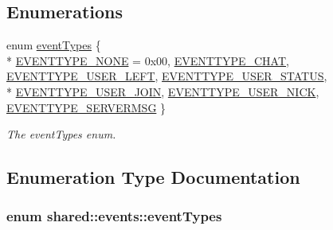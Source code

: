 \subsection*{Enumerations}
\begin{DoxyCompactItemize}
\item 
enum \hyperlink{namespaceshared_1_1events_a758b1a88b2eb1c9ef9388755f8869ad7}{event\-Types} \{ \\*
\hyperlink{namespaceshared_1_1events_a758b1a88b2eb1c9ef9388755f8869ad7aa9e485704f21f82413549a0228364596}{E\-V\-E\-N\-T\-T\-Y\-P\-E\-\_\-\-N\-O\-N\-E} = 0x00, 
\hyperlink{namespaceshared_1_1events_a758b1a88b2eb1c9ef9388755f8869ad7a5ab6f914eb6843be3d428f43169810c5}{E\-V\-E\-N\-T\-T\-Y\-P\-E\-\_\-\-C\-H\-A\-T}, 
\hyperlink{namespaceshared_1_1events_a758b1a88b2eb1c9ef9388755f8869ad7a11a907ca7840fc633c2dfb6efd6cc782}{E\-V\-E\-N\-T\-T\-Y\-P\-E\-\_\-\-U\-S\-E\-R\-\_\-\-L\-E\-F\-T}, 
\hyperlink{namespaceshared_1_1events_a758b1a88b2eb1c9ef9388755f8869ad7aac1455886686436f7d0bb87b9a4554cf}{E\-V\-E\-N\-T\-T\-Y\-P\-E\-\_\-\-U\-S\-E\-R\-\_\-\-S\-T\-A\-T\-U\-S}, 
\\*
\hyperlink{namespaceshared_1_1events_a758b1a88b2eb1c9ef9388755f8869ad7a9cb818acb5b5437a704503b7ac27a7ae}{E\-V\-E\-N\-T\-T\-Y\-P\-E\-\_\-\-U\-S\-E\-R\-\_\-\-J\-O\-I\-N}, 
\hyperlink{namespaceshared_1_1events_a758b1a88b2eb1c9ef9388755f8869ad7adec15b9d171b2e8ab5955a675ef3d6e9}{E\-V\-E\-N\-T\-T\-Y\-P\-E\-\_\-\-U\-S\-E\-R\-\_\-\-N\-I\-C\-K}, 
\hyperlink{namespaceshared_1_1events_a758b1a88b2eb1c9ef9388755f8869ad7ad90944ea70ecf0dcf722b0d44d35cac9}{E\-V\-E\-N\-T\-T\-Y\-P\-E\-\_\-\-S\-E\-R\-V\-E\-R\-M\-S\-G}
 \}
\begin{DoxyCompactList}\small\item\em The event\-Types enum. \end{DoxyCompactList}\end{DoxyCompactItemize}


\subsection{Enumeration Type Documentation}
\hypertarget{namespaceshared_1_1events_a758b1a88b2eb1c9ef9388755f8869ad7}{
\subsubsection[{event\-Types}]{\setlength{\rightskip}{0pt plus 5cm}enum {\bf shared\-::events\-::event\-Types}}}\label{d0/df8/namespaceshared_1_1events_a758b1a88b2eb1c9ef9388755f8869ad7}


